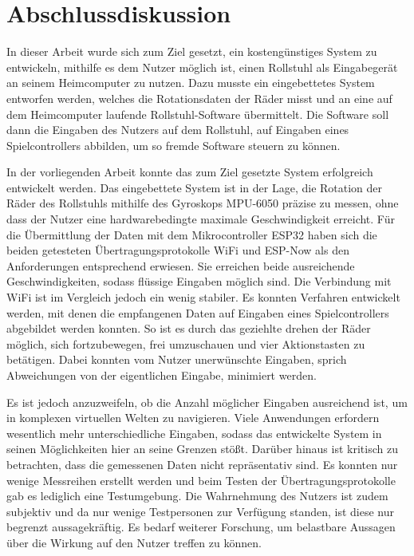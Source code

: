 \chapter{Abschlussdiskussion}
In dieser Arbeit wurde sich zum Ziel gesetzt, ein kostengünstiges System zu entwickeln, mithilfe es dem Nutzer möglich ist, einen Rollstuhl als Eingabegerät an seinem Heimcomputer zu nutzen.
Dazu musste ein eingebettetes System entworfen werden, welches die Rotationsdaten der Räder misst und an eine auf dem Heimcomputer laufende Rollstuhl-Software übermittelt.
Die Software soll dann die Eingaben des Nutzers auf dem Rollstuhl, auf Eingaben eines Spielcontrollers abbilden, um so fremde Software steuern zu können.

In der vorliegenden Arbeit konnte das zum Ziel gesetzte System erfolgreich entwickelt werden.
Das eingebettete System ist in der Lage, die Rotation der Räder des Rollstuhls mithilfe des Gyroskops MPU-6050 präzise zu messen, ohne dass der Nutzer eine hardwarebedingte maximale Geschwindigkeit erreicht.
Für die Übermittlung der Daten mit dem Mikrocontroller ESP32 haben sich die beiden getesteten Übertragungsprotokolle WiFi und ESP-Now als den Anforderungen entsprechend erwiesen.
Sie erreichen beide ausreichende Geschwindigkeiten, sodass flüssige Eingaben möglich sind.
Die Verbindung mit WiFi ist im Vergleich jedoch ein wenig stabiler.
Es konnten Verfahren entwickelt werden, mit denen die empfangenen Daten auf Eingaben eines Spielcontrollers abgebildet werden konnten.
So ist es durch das geziehlte drehen der Räder möglich, sich fortzubewegen, frei umzuschauen und vier Aktionstasten zu betätigen.
Dabei konnten vom Nutzer unerwünschte Eingaben, sprich Abweichungen von der eigentlichen Eingabe, minimiert werden.

Es ist jedoch anzuzweifeln, ob die Anzahl möglicher Eingaben ausreichend ist, um in komplexen virtuellen Welten zu navigieren.
Viele Anwendungen erfordern wesentlich mehr unterschiedliche Eingaben, sodass das entwickelte System in seinen Möglichkeiten hier an seine Grenzen stößt.
Darüber hinaus ist kritisch zu betrachten, dass die gemessenen Daten nicht repräsentativ sind.
Es konnten nur wenige Messreihen erstellt werden und beim Testen der Übertragungsprotokolle gab es lediglich eine Testumgebung.
Die Wahrnehmung des Nutzers ist zudem subjektiv und da nur wenige Testpersonen zur Verfügung standen, ist diese nur begrenzt aussagekräftig.
Es bedarf weiterer Forschung, um belastbare Aussagen über die Wirkung auf den Nutzer treffen zu können.

